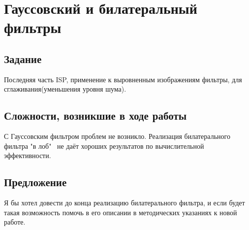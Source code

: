 \documentclass[a4paper,14pt]{extarticle} %
\begin{document}
\section{Гауссовский и билатеральный фильтры}

\subsection{Задание}
Последняя часть ISP, применение к выровненным изображениям фильтры, для сглаживания(уменьшения уровня шума).
  
\subsection{Сложности, возникшие в ходе работы}
С Гауссовским фильтром проблем не возникло. Реализация билатерального фильтра "в лоб" \ не даёт хороших результатов по вычислительной эффективности.   

\subsection{Предложение}
Я бы хотел довести до конца реализацию билатерального фильтра, и если будет такая возможность помочь в его описании в методических указаниях к новой работе. 

\pagebreak
\end{document}

